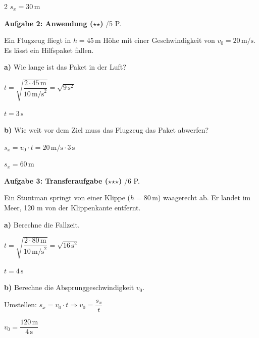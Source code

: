 \documentclass[10pt, a4paper]{article}
\newcommand{\fachfarbe}{physik}
\newcommand{\abschnitt}[1]{%
    \vspace{8pt}
    \noindent\textbf{\textcolor{\fachfarbe}{#1}}
    \vspace{4pt}
}
\newcommand{\punkte}[1]{\hfill\small\textcolor{grau}{/#1 P.}}
\newcommand{\stmark}{$\star$}
\begin{document}
\begin{multicols}{2}
{$\boxed{s_x = 30\,\text{m}}$
}

\vspace{8pt}


\abschnitt{Aufgabe 2: Anwendung (\stmark\stmark)}\punkte{5}

Ein Flugzeug fliegt in $h = 45\,\text{m}$ Höhe mit einer Geschwindigkeit von $v_0 = 20\,\text{m/s}$. Es lässt ein Hilfspaket fallen.

\textbf{a)} Wie lange ist das Paket in der Luft?

\vspace{4pt}
\textcolor{loesung}{
$t = \sqrt{\dfrac{2 \cdot 45\,\text{m}}{10\,\text{m/s}^2}} = \sqrt{9\,\text{s}^2}$

$\boxed{t = 3\,\text{s}}$
}

\vspace{6pt}

\textbf{b)} Wie weit vor dem Ziel muss das Flugzeug das Paket abwerfen?

\vspace{4pt}
\textcolor{loesung}{
$s_x = v_0 \cdot t = 20\,\text{m/s} \cdot 3\,\text{s}$

$\boxed{s_x = 60\,\text{m}}$
}

\vspace{8pt}


\abschnitt{Aufgabe 3: Transferaufgabe (\stmark\stmark\stmark)}\punkte{6}

Ein Stuntman springt von einer Klippe ($h = 80\,\text{m}$) waagerecht ab. Er landet im Meer, 120 m von der Klippenkante entfernt.

\textbf{a)} Berechne die Fallzeit.

\vspace{4pt}
\textcolor{loesung}{
$t = \sqrt{\dfrac{2 \cdot 80\,\text{m}}{10\,\text{m/s}^2}} = \sqrt{16\,\text{s}^2}$

$\boxed{t = 4\,\text{s}}$
}

\vspace{6pt}

\textbf{b)} Berechne die Absprunggeschwindigkeit $v_0$.

\vspace{4pt}
\textcolor{loesung}{
Umstellen: $s_x = v_0 \cdot t \Rightarrow v_0 = \dfrac{s_x}{t}$

$v_0 = \dfrac{120\,\text{m}}{4\,\text{s}}$

}
\end{multicols}
\end{document}
